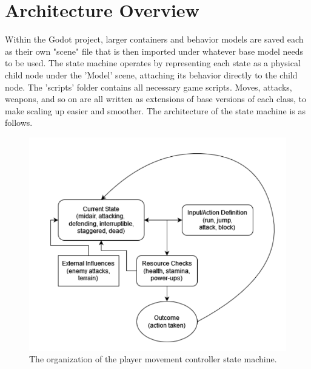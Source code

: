\documentclass[10pt,twocolumn]{article}
\begin{document}
\section{Architecture Overview}
Within the Godot project, larger containers and behavior models are saved each as their own "scene" file that is then imported under whatever base model needs to be used. The state machine operates by representing each state as a physical child node under the 'Model' scene, attaching its behavior directly to the child node. The 'scripts' folder contains all necessary game scripts. Moves, attacks, weapons, and so on are all written as extensions of base versions of each class, to make scaling up easier and smoother. The architecture of the state machine is as follows. 
\begin{figure}
    \centering
    \includegraphics[width=.95\linewidth]{sm.png}
    \caption{
        The organization of the player movement controller state machine.
    }
    \label{fig:first-page}
\end{figure}

\printbibliography
\end{document}
